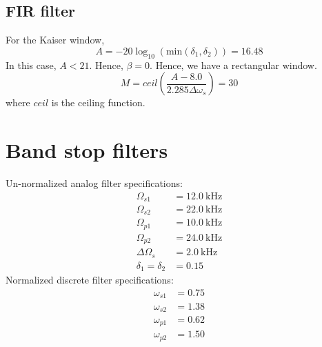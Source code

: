 \documentclass[12pt,a4paper]{scrartcl}
\begin{document}
		\subsection{FIR filter}
			For the Kaiser window,
			\begin{equation}
				A = -20 \log_{10}(\text{min}(\delta_1, \delta_2)) = 16.48
			\end{equation}
			In this case, $A < 21$. Hence, $\beta = 0$. Hence, we have a rectangular window.
			\begin{equation}
				M = ceil\left(\frac{A - 8.0}{2.285\Delta \omega_s}\right) = 30
			\end{equation}
			where $ceil$ is the ceiling function.
	\section{Band stop filters}
		Un-normalized analog filter specifications:
		\begin{align}
			\Omega_{s1} &= 12.0 \ \text{kHz} \\
			\Omega_{s2} &= 22.0 \ \text{kHz} \\
			\Omega_{p1} &= 10.0 \ \text{kHz} \\
			\Omega_{p2} &= 24.0 \ \text{kHz} \\
			\Delta \Omega_s &= 2.0 \ \text{kHz} \\
			\delta_1 = \delta_2 &= 0.15
		\end{align}
		Normalized discrete filter specifications:
		\begin{align}
			\omega_{s1} &= 0.75 \\
			\omega_{s2} &= 1.38 \\
			\omega_{p1} &= 0.62 \\
			\omega_{p2} &= 1.50 \\
		\end{align}
\end{document}
